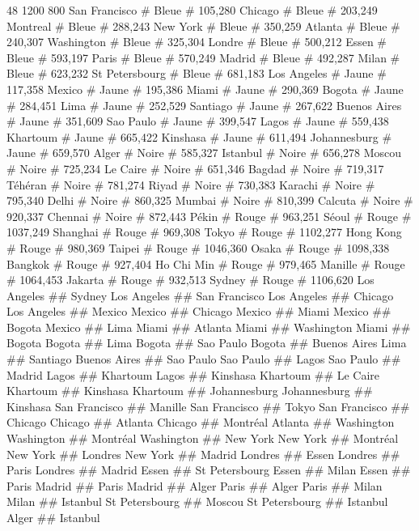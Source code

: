 48
1200 800
San Francisco	#	Bleue	# 	{ 105,280 }
Chicago			#	Bleue	#	{ 203,249 }
Montreal		#	Bleue	#	{ 288,243 }
New York		#	Bleue	#	{ 350,259 }
Atlanta			#	Bleue	#	{ 240,307 }
Washington		#	Bleue	#	{ 325,304 }
Londre			#	Bleue	#	{ 500,212 }
Essen			#	Bleue	#	{ 593,197 }
Paris			#	Bleue	#	{ 570,249 }
Madrid			#	Bleue	#	{ 492,287 }
Milan			#	Bleue	#	{ 623,232 }
St Petersbourg	# 	Bleue	#	{ 681,183 }
Los Angeles		#	Jaune	#	{ 117,358 }
Mexico			#	Jaune	#	{ 195,386 }
Miami			#	Jaune	#	{ 290,369 }
Bogota			#	Jaune	#	{ 284,451 }
Lima			#	Jaune	#	{ 252,529 }
Santiago		#	Jaune	#	{ 267,622 }
Buenos Aires	#	Jaune	#	{ 351,609 }
Sao Paulo		#	Jaune	#	{ 399,547 }
Lagos			#	Jaune	#	{ 559,438 }
Khartoum		#	Jaune	#	{ 665,422 }
Kinshasa		#	Jaune	#	{ 611,494 }
Johannesburg	#	Jaune	#	{ 659,570 }
Alger			# 	Noire	#	{ 585,327 }
Istanbul		# 	Noire	#	{ 656,278 }
Moscou			# 	Noire	#	{ 725,234 }
Le Caire		# 	Noire	#	{ 651,346 }
Bagdad			# 	Noire	#	{ 719,317 }
Téhéran			# 	Noire	#	{ 781,274 }
Riyad			# 	Noire	#	{ 730,383 }
Karachi			# 	Noire	#	{ 795,340 }
Delhi			# 	Noire	#	{ 860,325 }
Mumbai			# 	Noire	#	{ 810,399 }
Calcuta			# 	Noire	#	{ 920,337 }
Chennai			# 	Noire	#	{ 872,443 }
Pékin			#	Rouge	#	{ 963,251 }
Séoul			#	Rouge	#	{ 1037,249 }
Shanghai		#	Rouge	#	{ 969,308 }
Tokyo			#	Rouge	#	{ 1102,277 }
Hong Kong		#	Rouge	#	{ 980,369 }
Taipei			#	Rouge	#	{ 1046,360 }
Osaka			#	Rouge	#	{ 1098,338 }
Bangkok			#	Rouge	#	{ 927,404 }
Ho Chi Min		#	Rouge	#	{ 979,465 }
Manille			#	Rouge	#	{ 1064,453 }
Jakarta			#	Rouge	#	{ 932,513 }
Sydney			#	Rouge	#	{ 1106,620 }
Los Angeles		##	Sydney
Los Angeles		##	San Francisco
Los Angeles		##	Chicago
Los Angeles		##	Mexico
Mexico			##	Chicago
Mexico			##	Miami
Mexico			##	Bogota
Mexico			##	Lima
Miami			##	Atlanta
Miami			##	Washington
Miami			##	Bogota
Bogota			##	Lima
Bogota			##	Sao Paulo
Bogota			##	Buenos Aires
Lima			##	Santiago
Buenos Aires	##	Sao Paulo
Sao Paulo		##	Lagos
Sao Paulo		##	Madrid
Lagos			##	Khartoum
Lagos			##	Kinshasa
Khartoum		##	Le Caire
Khartoum		##	Kinshasa
Khartoum		##	Johannesburg
Johannesburg	##	Kinshasa
San Francisco	##	Manille
San Francisco	##	Tokyo
San Francisco	##	Chicago
Chicago			##	Atlanta
Chicago			##	Montréal
Atlanta			## 	Washington
Washington		## 	Montréal
Washington		## 	New York
New York		##	Montréal
New York		##	Londres
New York		##	Madrid
Londres			##	Essen
Londres			##	Paris
Londres			##	Madrid
Essen			##	St Petersbourg
Essen			##	Milan
Essen			##	Paris
Madrid			##	Paris
Madrid			##	Alger
Paris			##	Alger
Paris			##	Milan
Milan			##	Istanbul
St Petersbourg	##	Moscou
St Petersbourg	##	Istanbul
Alger	##	Istanbul
